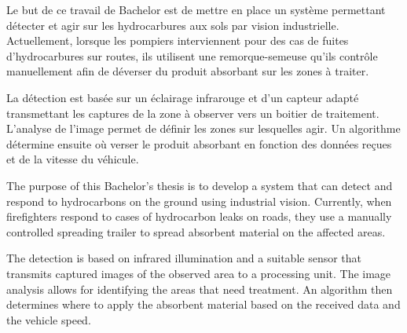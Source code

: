 Le but de ce travail de Bachelor est de mettre en place un système permettant détecter et agir sur les hydrocarbures aux sols par vision industrielle. Actuellement, lorsque les pompiers interviennent pour des cas de fuites d'hydrocarbures sur routes, ils utilisent une remorque-semeuse qu'ils contrôle manuellement afin de déverser du produit absorbant sur les zones à traiter.

La détection est basée sur un éclairage infrarouge et d'un capteur adapté transmettant les captures de la zone à observer vers un boitier de traitement. L'analyse de l'image permet de définir les zones sur lesquelles agir. Un algorithme détermine ensuite où verser le produit absorbant en fonction des données reçues et de la vitesse du véhicule.


\asterism

The purpose of this Bachelor's thesis is to develop a system that can detect and respond to hydrocarbons on the ground using industrial vision. Currently, when firefighters respond to cases of hydrocarbon leaks on roads, they use a manually controlled spreading trailer to spread absorbent material on the affected areas.

The detection is based on infrared illumination and a suitable sensor that transmits captured images of the observed area to a processing unit. The image analysis allows for identifying the areas that need treatment. An algorithm then determines where to apply the absorbent material based on the received data and the vehicle speed.

